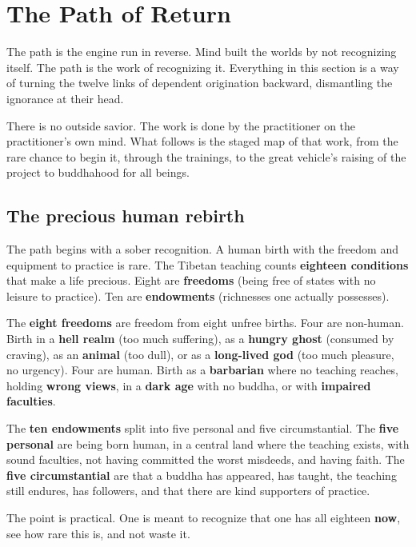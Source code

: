 \section{The Path of Return}

The path is the engine run in reverse. Mind built the worlds by not recognizing itself. The path is the work of recognizing it. Everything in this section is a way of turning the twelve links of dependent origination backward, dismantling the ignorance at their head.

There is no outside savior. The work is done by the practitioner on the practitioner's own mind. What follows is the staged map of that work, from the rare chance to begin it, through the trainings, to the great vehicle's raising of the project to buddhahood for all beings.

\subsection{The precious human rebirth}

The path begins with a sober recognition. A human birth with the freedom and equipment to practice is rare. The Tibetan teaching counts \textbf{eighteen conditions} that make a life precious. Eight are \textbf{freedoms} (being free of states with no leisure to practice). Ten are \textbf{endowments} (richnesses one actually possesses).

The \textbf{eight freedoms} are freedom from eight unfree births. Four are non-human. Birth in a \textbf{hell realm} (too much suffering), as a \textbf{hungry ghost} (consumed by craving), as an \textbf{animal} (too dull), or as a \textbf{long-lived god} (too much pleasure, no urgency). Four are human. Birth as a \textbf{barbarian} where no teaching reaches, holding \textbf{wrong views}, in a \textbf{dark age} with no buddha, or with \textbf{impaired faculties}.

The \textbf{ten endowments} split into five personal and five circumstantial. The \textbf{five personal} are being born human, in a central land where the teaching exists, with sound faculties, not having committed the worst misdeeds, and having faith. The \textbf{five circumstantial} are that a buddha has appeared, has taught, the teaching still endures, has followers, and that there are kind supporters of practice.

The point is practical. One is meant to recognize that one has all eighteen \textbf{now}, see how rare this is, and not waste it.

